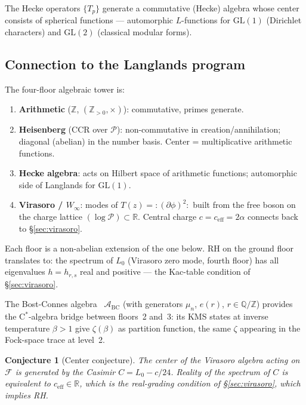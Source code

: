 \documentclass[%
 aip,
 amsmath,amssymb,
 reprint,%
]{revtex4-1}
\theoremstyle{plain}
\newtheorem{conjecture}{Conjecture}[section]
\theoremstyle{definition}
\newcommand{\R}{\mathbb{R}}
\newcommand{\Z}{\mathbb{Z}}
\newcommand{\Q}{\mathbb{Q}}
\begin{document}
The Hecke operators $\{T_p\}$ generate a commutative (Hecke) algebra whose center
consists of spherical functions --- automorphic $L$-functions for
$\mathrm{GL}(1)$ (Dirichlet characters) and $\mathrm{GL}(2)$ (classical modular forms).

\subsection{Connection to the Langlands program}

The four-floor algebraic tower is:
\begin{enumerate}
\item \textbf{Arithmetic} ($\Z$, $(\Z_{>0},\times)$): commutative, primes generate.
\item \textbf{Heisenberg} (CCR over $\mathcal{P}$): non-commutative in
  creation/annihilation; diagonal (abelian) in the number basis.
  Center = multiplicative arithmetic functions.
\item \textbf{Hecke algebra}: acts on Hilbert space of arithmetic functions;
  automorphic side of Langlands for $\mathrm{GL}(1)$.
\item \textbf{Virasoro / $W_\infty$}: modes of $T(z) = :(\partial\phi)^2:$
  built from the free boson on the charge lattice $(\log\mathcal{P})\subset\R$.
  Central charge $c = c_{\mathrm{eff}} = 2\alpha$ connects back to \S\ref{sec:virasoro}.
\end{enumerate}

Each floor is a non-abelian extension of the one below. RH on the ground floor
translates to: the spectrum of $L_0$ (Virasoro zero mode, fourth floor) has all
eigenvalues $h = h_{r,s}$ real and positive --- the Kac-table condition of
\S\ref{sec:virasoro}.

The Bost-Connes algebra~\cite{BostConnes1995}
$\mathcal{A}_{\mathrm{BC}}$ (with generators $\mu_n$, $e(r)$,
$r\in\Q/\Z$) provides the $\mathrm{C}^*$-algebra bridge between floors~2 and~3:
its KMS states at inverse temperature $\beta > 1$ give $\zeta(\beta)$ as
partition function, the same $\zeta$ appearing in the Fock-space trace at
level~2.

\begin{conjecture}[Center conjecture]\label{conj:center}
The center of the Virasoro algebra acting on $\mathcal{F}$ is generated by the
Casimir $C = L_0 - c/24$. Reality of the spectrum of $C$ is equivalent to
$c_{\mathrm{eff}} \in \R$, which is the real-grading condition of
\S\ref{sec:virasoro}, which implies RH.
\end{conjecture}
\end{document}
